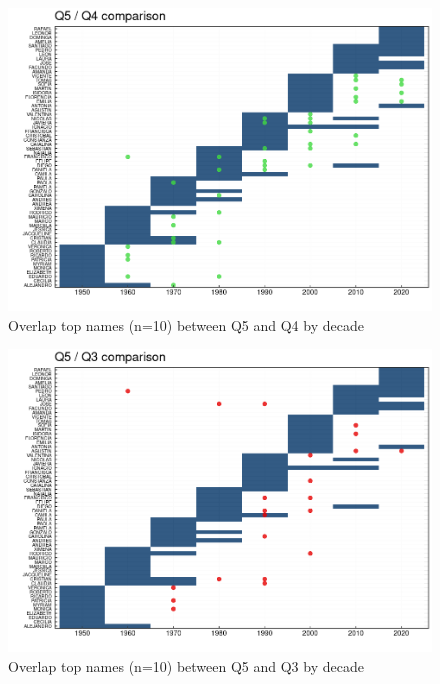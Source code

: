 \begin{figure}[H]
\begin{center}
    \includegraphics[width=12cm]{plot/q5_q4_comparison.png}
    \caption{Overlap top names (n=10) between Q5 and Q4 by decade}
    \label{fig:new_names}
\end{center}
\end{figure}

\begin{figure}[H]
\begin{center}
    \includegraphics[width=12cm]{plot/q5_q3_comparison.png}
    \caption{Overlap top names (n=10) between Q5 and Q3 by decade}
    \label{fig:new_names}
\end{center}
\end{figure}

